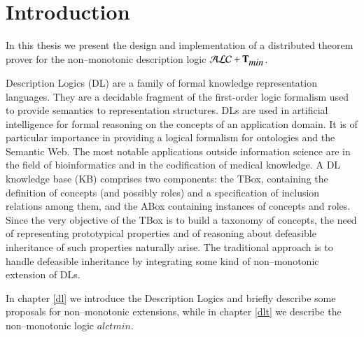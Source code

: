 \documentclass[a4paper, 11pt, oneside]{elsarticle}
\newcommand{\tip}{{\bf T}}
\newcommand{\alctmin}{\mathcal{ALC}+\tip_{\mbox{\em min}}}
\begin{document}
\newpage


\tableofcontents

\newpage


\section{Introduction}

In this thesis we present the design and implementation of a distributed theorem prover for the non--monotonic description logic $\alctmin$.

Description Logics (DL) are a family of formal knowledge representation languages. They are a decidable fragment of the first-order logic formalism used to provide semantics to representation structures.
DLs are used in artificial intelligence for formal reasoning on the concepts of an application domain. It is of particular importance in providing a logical formalism for ontologies and the Semantic Web. The most notable applications outside information science are in the field of bioinformatics and in the codification of medical knowledge. A DL knowledge base (KB) comprises two components: the TBox, containing the definition of concepts (and possibly roles) and a specification of inclusion relations among them, and the ABox containing instances of concepts and roles. Since the very objective of the TBox is to build a taxonomy of concepts, the need of representing prototypical properties and of reasoning about defeasible inheritance of such properties naturally arise. The traditional approach is to handle defeasible inheritance by integrating some kind of non--monotonic extension of DLs.

In chapter \ref{dl} we introduce the Description Logics and briefly describe some proposals for non--monotonic extensions, while in chapter \ref{dlt} we describe the non--monotonic logic $alctmin$.\\
\end{document}
